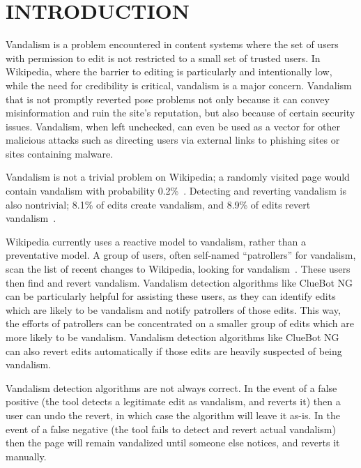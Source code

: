 \section{INTRODUCTION}
\label{s:intro}

Vandalism is a problem encountered in content systems where the set of users with permission to edit is not restricted to a small set of trusted users. In Wikipedia, where the barrier to editing is particularly and intentionally low, while the need for credibility is critical, vandalism is a major concern. Vandalism that is not promptly reverted pose problems not only because it can convey misinformation and ruin the site's reputation, but also because of certain security issues. Vandalism, when left unchecked, can even be used as a vector for other malicious attacks such as directing users via external links to phishing sites or sites containing malware.

Vandalism is not a trivial problem on Wikipedia; a randomly visited page would contain vandalism with probability 0.2\%~\cite{vandalism-statistics}. Detecting and reverting vandalism is also nontrivial; 8.1\% of edits create vandalism, and 8.9\% of edits revert vandalism~\cite{changes-survey}.

Wikipedia currently uses a reactive model to vandalism, rather than a preventative model. A group of users, often self-named ``patrollers'' for vandalism, scan the list of recent changes to Wikipedia, looking for vandalism~\cite{recent}. These users then find and revert vandalism. Vandalism detection algorithms like ClueBot NG can be particularly helpful for assisting these users, as they can identify edits which are likely to be vandalism and notify patrollers of those edits. This way, the efforts of patrollers can be concentrated on a smaller group of edits which are more likely to be vandalism. Vandalism detection algorithms like ClueBot NG can also revert edits automatically if those edits are heavily suspected of being vandalism.

Vandalism detection algorithms are not always correct. In the event of a false positive (the tool detects a legitimate edit as vandalism, and reverts it) then a user can undo the revert, in which case the algorithm will leave it as-is. In the event of a false negative (the tool fails to detect and revert actual vandalism) then the page will remain vandalized until someone else notices, and reverts it manually.


